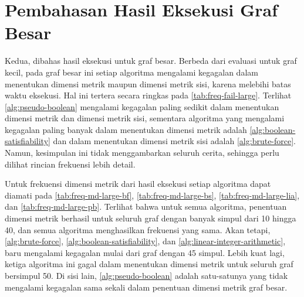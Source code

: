 \begin{landscape}
\begin{center}
	\renewcommand{\minipagewidth}{0.475\linewidth}

	\vphantom{}
	\vfill

	
	\hspace{2em}
	

	\vspace{2em}

	
	\hspace{2em}
	

	\vfill \vfill \vfill
\end{center}
\end{landscape}

\section{Pembahasan Hasil Eksekusi Graf Besar}
\label{sec:discussion-large}

Kedua, dibahas hasil eksekusi untuk graf besar. Berbeda dari evaluasi untuk graf kecil, pada graf besar ini setiap algoritma mengalami kegagalan dalam menentukan dimensi metrik maupun dimensi metrik sisi, karena melebihi batas waktu eksekusi. Hal ini tertera secara ringkas pada \autoref{tab:freq-fail-large}. Terlihat \autoref{alg:pseudo-boolean} mengalami kegagalan paling sedikit dalam menentukan dimensi metrik dan dimensi metrik sisi, sementara algoritma yang mengalami kegagalan paling banyak dalam menentukan dimensi metrik adalah \autoref{alg:boolean-satisfiability} dan dalam menentukan dimensi metrik sisi adalah \autoref{alg:brute-force}. Namun, kesimpulan ini tidak menggambarkan seluruh cerita, sehingga perlu dilihat rincian frekuensi lebih detail.

Untuk frekuensi dimensi metrik dari hasil eksekusi setiap algoritma dapat diamati pada \autoref{tab:freq-md-large-bf}, \autoref{tab:freq-md-large-bs}, \autoref{tab:freq-md-large-lia}, dan \autoref{tab:freq-md-large-pb}. Terlihat bahwa untuk semua algoritma, penentuan dimensi metrik berhasil untuk seluruh graf dengan banyak simpul dari 10 hingga 40, dan semua algoritma menghasilkan frekuensi yang sama. Akan tetapi, \autoref{alg:brute-force}, \autoref{alg:boolean-satisfiability}, dan \autoref{alg:linear-integer-arithmetic}, baru mengalami kegagalan mulai dari graf dengan 45 simpul. Lebih kuat lagi, ketiga algoritma ini gagal dalam menentukan dimensi metrik untuk seluruh graf bersimpul 50. Di sisi lain, \autoref{alg:pseudo-boolean} adalah satu-satunya yang tidak mengalami kegagalan sama sekali dalam penentuan dimensi metrik graf besar.


